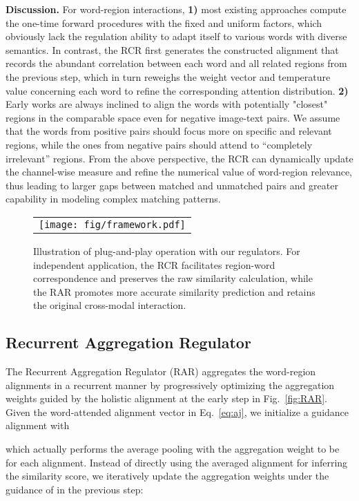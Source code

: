 \documentclass[journal]{IEEEtran}\newcommand{\ignore}[1]{}
\begin{document}
{\bf Discussion.} For word-region interactions, \textbf{1)} most existing approaches compute the one-time forward procedures with the fixed and uniform factors, which obviously lack the regulation ability to adapt itself to various words with diverse semantics. In contrast, the RCR first generates the constructed alignment that records the abundant correlation between each word and all related regions from the previous step, which in turn reweighs the weight vector and temperature value concerning each word to refine the corresponding attention distribution. 
\textbf{2)} Early works are always inclined to align the words with potentially "closest" regions in the comparable space even for negative image-text pairs. We assume that the words from positive pairs should focus more on specific and relevant regions, while the ones from negative pairs should attend to “completely irrelevant” regions. From the above perspective, the RCR can dynamically update the channel-wise measure and refine the numerical value of word-region relevance, thus leading to larger gaps between matched and unmatched pairs and greater capability in modeling complex matching patterns.

\begin{figure*}[t!]
	\centering
	\begin{tabular}{@{}c}
		\texttt{[image: fig/framework.pdf]} 
	\end{tabular}
	\caption{Illustration of plug-and-play operation with our regulators. For independent application, the RCR facilitates region-word correspondence and preserves the raw similarity calculation, while the RAR promotes more accurate similarity prediction and retains the original cross-modal interaction.}
	\label{fig:framework}
\end{figure*}

\subsection{Recurrent Aggregation Regulator}
The Recurrent Aggregation Regulator (RAR) aggregates the word-region alignments in a recurrent manner by progressively optimizing the aggregation weights guided by the holistic alignment at the early step in Fig.~\ref{fig:RAR}.
Given the word-attended alignment vector  in Eq.~\eqref{eq:aj}, we initialize a guidance alignment with

which actually performs the average pooling with the aggregation weight to be  for each alignment.
Instead of directly using the averaged alignment  for inferring the similarity score, we iteratively update the aggregation weights under the guidance of  in the previous step:
\end{document}
